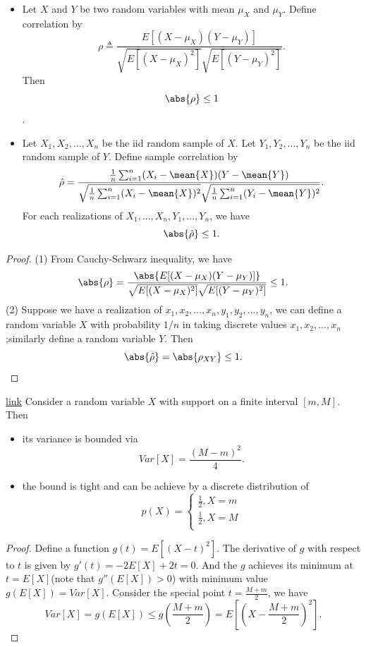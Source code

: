 \begin{refsection}
\begin{corollary}\label{ch:theory-of-probability:th:Cauchy-SchwarzInequalityBoundsOnCorrelations}\hfill
\begin{itemize}
	\item Let $X$ and $Y$ be two random variables with mean $\mu_X$ and $\mu_Y$. Define correlation by
	$$\rho \triangleq \frac{E[(X-\mu_X)(Y-\mu_Y)]}{\sqrt{E[(X-\mu_X)^2]}\sqrt{E[(Y-\mu_Y)^2]}}.$$
	Then $$\abs{\rho} \leq 1$$.
	\item Let $X_1,X_2,...,X_n$ be the iid random sample of $X$. Let $Y_1,Y_2,...,Y_n$ be the iid random sample of $Y$. Define sample correlation by
	$$\hat{\rho} = \frac{\frac{1}{n}\sum_{i=1}^n (X_i - \mean{X})(Y-\mean{Y})}{\sqrt{\frac{1}{n}\sum_{i=1}^n (X_i - \mean{X})^2}\sqrt{\frac{1}{n}\sum_{i=1}^n (Y_i - \mean{Y})^2}}.$$
	For each realizations of $X_1,...,X_n, Y_1,...,Y_n$, we have
	$$\abs{\hat{\rho}}\leq 1. $$		
\end{itemize}	
\end{corollary}
\begin{proof}
(1) From Cauchy-Schwarz inequality, we have
$$\abs{\rho} = \frac{\abs{E[(X-\mu_X)(Y-\mu_Y)]}}{\sqrt{E[(X-\mu_X)^2]}\sqrt{E[(Y-\mu_Y)^2]}} \leq 1.$$
(2) Suppose we have a realization of $x_1,x_2,...,x_n, y_1,y_2,...,y_n$, we can define a random variable $X$ with probability $1/n$ in taking discrete values $x_1,x_2,...,x_n$;similarly define a random variable $Y$.
Then
$$\abs{\hat{\rho}} = \abs{\rho_{XY}} \leq 1.$$
\end{proof}



\begin{lemma}\href{https://stats.stackexchange.com/questions/45588/variance-of-a-bounded-random-variable}{link}\label{ch:theory-of-probability:th:PopoviciuUpperBoundForVariance}
Consider a random variable $X$ with support on a finite interval $[m,M]$. Then 
\begin{itemize}
	\item its variance is bounded via 
	$$Var[X] = \frac{(M-m)^2}{4}.$$
	\item the bound is tight and can be achieve by a discrete distribution of 
	$$p(X) = \begin{cases*}
	\frac{1}{2}, X = m\\
	\frac{1}{2}, X = M\\
	\end{cases*}$$
\end{itemize}	
\end{lemma}
\begin{proof}
Define a function $g(t) = E[(X-t)^2]$.
The derivative of $g$ with respect to $t$ is given by $g'(t) = -2E[X] + 2t = 0$. And the $g$ achieves its minimum at $t = E[X]$(note that $g''(E[X]) > 0$) with minimum value $g(E[X]) = Var[X]$.
Consider the special point $t = \frac{M+m}{2}$, we have
$$Var[X] = g(E[X]) \leq g(\frac{M+m}{2}) = E[(X - \frac{M+m}{2})^2].$$


\end{proof}
\end{refsection}
